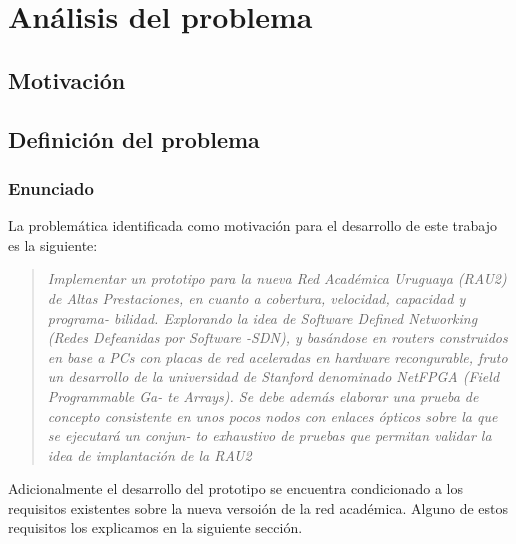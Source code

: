 
\chapter{An\'alisis del problema}

\ifpdf
    \graphicspath{{Chapter2/Figs/Raster/}{Chapter2/Figs/PDF/}{Chapter2/Figs/}}
\else
    \graphicspath{{Chapter2/Figs/Vector/}{Chapter2/Figs/}}
\fi


\section[Motivaci\'on]{Motivaci\'on}

\section[Definici\'on del problema]{Definici\'on del problema}

\subsection[Enunciado]{Enunciado}

La problem\'atica identificada como motivaci\'on para el desarrollo de este trabajo es la siguiente:

\begin{quote}
\textit{Implementar un prototipo para la nueva Red Académica Uruguaya (RAU2) de
Altas Prestaciones, en cuanto a cobertura, velocidad, capacidad y programa-
bilidad. Explorando la idea de Software Defined Networking (Redes Defeanidas
por Software -SDN), y basándose en routers construidos en base a PCs con
placas de red aceleradas en hardware recongurable, fruto un desarrollo de
la universidad de Stanford denominado NetFPGA (Field Programmable Ga-
te Arrays). Se debe además elaborar una prueba de concepto consistente en
unos pocos nodos con enlaces ópticos sobre la que se ejecutará un conjun-
to exhaustivo de pruebas que permitan validar la idea de implantación de la
RAU2}
\end{quote}

Adicionalmente el desarrollo del prototipo se encuentra condicionado a los requisitos existentes sobre la nueva versoi\'on de la red acad\'emica. Alguno de estos requisitos los explicamos en la siguiente secci\'on.

